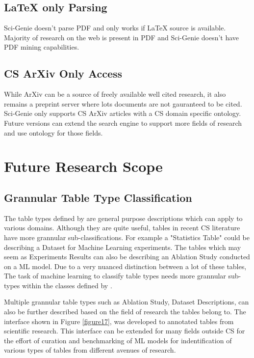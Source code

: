 \subsection{LaTeX only Parsing}
Sci-Genie doesn't parse PDF and only works if LaTeX source is available. Majority of research on the web is present in PDF and Sci-Genie doesn't have PDF mining capabilities. 

\subsection{CS ArXiv Only Access}
While ArXiv can be a source of freely available well cited research, it also remains a preprint server where lots documents are not gauranteed to be cited. Sci-Genie only supports CS ArXiv articles with a CS domain specific ontology. Future versions can extend the search engine to support more fields of research and use ontology for those fields. 

\section{Future Research Scope}
\label{conclusion:future-scope}
\subsection{Grannular Table Type Classification}
\label{conclusion:future-scope:type-class}

The table types defined by \cite{kim2012scientific} are general purpose descriptions which can apply to various domains. Although they are quite useful, tables in recent CS literature have more grannular sub-classifications. For example a "Statistics Table" could be describing a Dataset for Machine Learning experiments. The tables which may seem as Experiments Results can also be describing an Ablation Study conducted on a ML model. Due to a very nuanced distinction between a lot of these tables, The task of machine learning to classify table types needs more grannular sub-types within the classes defined by \cite{kim2012scientific}. 

Multiple grannular table types such as Ablation Study, Dataset Descriptions, can also be further described based on the field of research the tables belong to. The interface shown in Figure \ref{figure17}, was developed to annotated tables from scientific research. This interface can be extended for many fields outside CS for the effort of curation and benchmarking of ML models for indentification of various types of tables from different avenues of research. 


